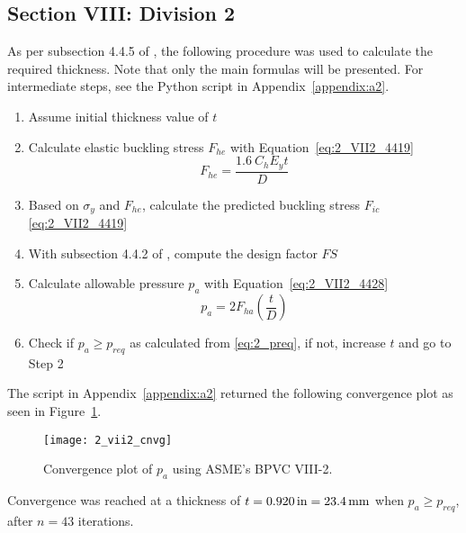 \subsection{Section VIII: Division 2}
\label{section:2_VIII2}
As per subsection 4.4.5 of \cite{ASMEbvpcVII2}, the following procedure was used to calculate the required thickness. Note that only the main formulas will be presented. For intermediate steps, see  the Python script in Appendix~\ref{appendix:a2}.
\begin{enumerate}
	\item Assume initial thickness value of $t$
	\item Calculate elastic buckling stress $F_{he}$ with Equation~\ref{eq:2_VII2_4419}
	      \begin{equation}
	      	\label{eq:2_VII2_4419}
	      	F_{he} = \frac{1.6\ C_h E_y t}{D}
	      \end{equation}
	\item Based on $\sigma_y$ and $F_{he}$, calculate the predicted buckling stress $F_{ic}$ \ref{eq:2_VII2_4419}
	\item With subsection 4.4.2 of \cite{ASMEbvpcVII2}, compute the design factor $FS$
	\item Calculate allowable pressure $p_a$ with Equation~\ref{eq:2_VII2_4428}
	      \begin{equation}
	      	\label{eq:2_VII2_4428}
	      	p_a = 2 F_{ha} \left(\frac{t}{D}\right)
	      \end{equation}
	\item Check if $p_a \geq p_{req}$ as calculated from \ref{eq:2_preq}, if not, increase $t$ and go to Step 2 \\
	      	
\end{enumerate}

The script in Appendix~\ref{appendix:a2} returned the following convergence plot as seen in Figure~\ref{fig:2_vii2_cnvg}.
\begin{figure}[H]
	\centering
	\texttt{[image: 2\_vii2\_cnvg]}
	\caption{Convergence plot of $p_a$ using ASME's BPVC VIII-2.}
	\label{fig:2_vii2_cnvg}
\end{figure}

Convergence was reached at a thickness of $t = 0.920\,\mathrm{in}= 23.4\,\mathrm{mm}$ when $p_a\geq p_{req}$, after $n=43$ iterations. 


